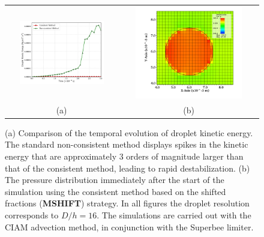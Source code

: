 \begin{figure}
\begin{center}
\begin{tabular}{cc}
\hspace*{-1.0cm}
\includegraphics[width=0.8\textwidth]{plots/raindrop/ke_compare.png} &
\hspace{-0.4cm}%
\includegraphics[width=0.8\textwidth]{plots/raindrop/mc_16ppd_pressure.png}\\
\hspace{-0.8cm}%
(a) & (b)
\end{tabular}
\end{center}
\caption{ (a) Comparison of the temporal evolution of droplet kinetic energy. 
The standard non-consistent method displays spikes in the kinetic energy that are 
approximately 3 orders of magnitude larger than that of the consistent method, 
leading to rapid destabilization. 
(b) The pressure distribution immediately after the start of the simulation 
using the consistent method based on the shifted fractions (\textbf{MSHIFT}) strategy. 
In all figures the droplet resolution corresponds to $D/h = 16$.
The simulations are carried out with the CIAM advection method, in conjunction with the Superbee limiter.}
\label{pressure_2}
\end{figure}

